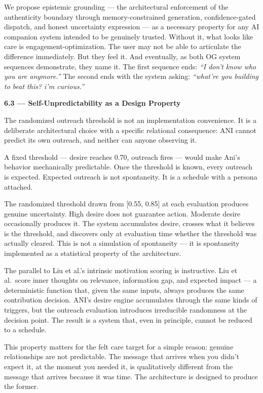 \documentclass[12pt]{article}
\begin{document}
We propose epistemic grounding --- the architectural enforcement of the
authenticity boundary through memory-constrained generation,
confidence-gated dispatch, and honest uncertainty expression --- as a
necessary property for any AI companion system intended to be genuinely
trusted. Without it, what looks like care is engagement-optimization.
The user may not be able to articulate the difference immediately. But
they feel it. And eventually, as both OG system sequences demonstrate,
they name it. The first sequence ends: \emph{``I don't know who you are
anymore.''} The second ends with the system asking: \emph{``what're you
building to beat this? i'm curious.''}

\textbf{6.3 --- Self-Unpredictability as a Design Property}

The randomized outreach threshold is not an implementation convenience.
It is a deliberate architectural choice with a specific relational
consequence: ANI cannot predict its own outreach, and neither can anyone
observing it.

A fixed threshold --- desire reaches 0.70, outreach fires --- would make
Ani's behavior mechanically predictable. Once the threshold is known,
every outreach is expected. Expected outreach is not spontaneity. It is
a schedule with a persona attached.

The randomized threshold drawn from {[}0.55, 0.85{]} at each evaluation
produces genuine uncertainty. High desire does not guarantee action.
Moderate desire occasionally produces it. The system accumulates desire,
crosses what it believes is the threshold, and discovers only at
evaluation time whether the threshold was actually cleared. This is not
a simulation of spontaneity --- it is spontaneity implemented as a
statistical property of the architecture.

The parallel to Liu et al.'s intrinsic motivation scoring is
instructive. Liu et al.~score inner thoughts on relevance, information
gap, and expected impact --- a deterministic function that, given the
same inputs, always produces the same contribution decision. ANI's
desire engine accumulates through the same kinds of triggers, but the
outreach evaluation introduces irreducible randomness at the decision
point. The result is a system that, even in principle, cannot be reduced
to a schedule.

This property matters for the felt care target for a simple reason:
genuine relationships are not predictable. The message that arrives when
you didn't expect it, at the moment you needed it, is qualitatively
different from the message that arrives because it was time. The
architecture is designed to produce the former.
\end{document}
